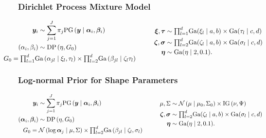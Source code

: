 \documentclass[aspectratio=169]{beamer}
\begin{document}
\begin{frame}
  \frametitle{Dirichlet Process Mixture Model}
  \begin{equation*}
    \begin{aligned}
      \bm{ y}_i &\sim \sum_{j = 1}^J\pi_j\text{PG}\left(\bm{ y}\mid \bm{ \alpha}_i, \bm{ \beta}_i\right)\\
      (\alpha_i,\beta_i) &\sim \text{DP}\left(\eta, G_0\right)\\
      &~\hspace{-2cm}G_0 = {\textstyle\prod}_{l = 1}^d\text{Ga}\left(\alpha_{jl}\mid\xi_{l},\tau_{l}\right)
                    \times{\textstyle\prod}_{l=2}^d\text{Ga}\left(\beta_{jl}\mid\zeta_{l}\tau_{l}\right)
    \end{aligned}
    \hspace{1cm}
    \begin{aligned}
      \bm{ \xi},\bm{ \tau} &\sim {\textstyle \prod}_{l = 1}^d \text{Ga}(\xi_l\mid a,b)
              \times \text{Ga}(\tau_l\mid c,d)\\
      \bm{ \zeta},\bm{\sigma} &\sim {\textstyle\prod}_{l = 2}^d\text{Ga}(\zeta_l \mid a,b)
              \times \text{Ga}(\sigma_l\mid c,d)\\
      \bm{ \eta} &\sim \text{Ga}(\eta \mid 2, 0.1).
    \end{aligned}
  \end{equation*}
\end{frame}

\begin{frame}
  \frametitle{Log-normal Prior for Shape Parameters}
  \begin{equation*}
    \begin{aligned}
      \bm{ y}_i &\sim \sum_{j = 1}^J\pi_j\text{PG}\left(\bm{ y}\mid \bm{ \alpha}_i, \bm{\beta}_i\right)\\
      (\bm{\alpha}_i, \bm{\beta}_i) &\sim \text{DP}\left(\eta, G_0\right)\\
        &~\hspace{-1cm}G_0 = \mathcal{N}\left(\log\bm{ \alpha}_{j}\mid\mu,\Sigma\right)\times
            {\textstyle\prod}_{l = 2}^d\text{Ga}\left(\beta_{jl}\mid\zeta_l,\sigma_l\right)
    \end{aligned}
    \hspace{1cm}
    \begin{aligned}
      \mu,\Sigma &\sim \mathcal{N}\left(\mu\mid\mu_0,\Sigma_0\right)
                                  \times \text{IG}\left(\nu,\Psi\right)\\
      \bm{ \zeta},\bm{\sigma} &\sim {\textstyle\prod}_{l = 2}^d\text{Ga}(\zeta_l \mid a,b)
                                \times \text{Ga}(\sigma_l \mid c,d) \\
      \bm{ \eta} &\sim \text{Ga}(\eta \mid 2, 0.1).
    \end{aligned}
  \end{equation*}
\end{frame}
\end{document}
